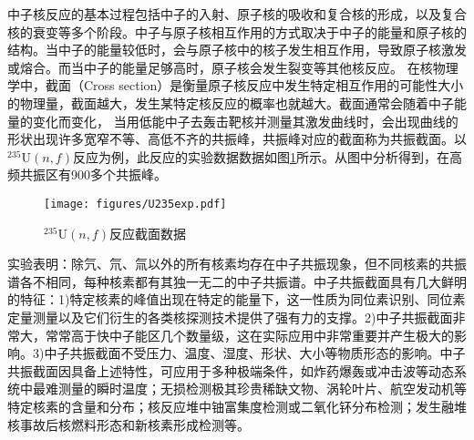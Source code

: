 中子核反应的基本过程包括中子的入射、原子核的吸收和复合核的形成，以及复合核的衰变等多个阶段\cite{卢希庭2000原子核物理}。中子与原子核相互作用的方式取决于中子的能量和原子核的结构。当中子的能量较低时，会与原子核中的核子发生相互作用，导致原子核激发或熔合。而当中子的能量足够高时，原子核会发生裂变等其他核反应。
在核物理学中，截面（Cross section）是衡量原子核反应中发生特定相互作用的可能性大小的物理量，截面越大，发生某特定核反应的概率也就越大。截面通常会随着中子能量的变化而变化，
当用低能中子去轰击靶核并测量其激发曲线时，会出现曲线的形状出现许多宽窄不等、高低不齐的共振峰，共振峰对应的截面称为共振截面。以$^{235}\text{U}(n,f)$反应为例，此反应的实验数据数据如图\ref{u235expendf}所示。从图中分析得到，在高频共振区有900多个共振峰。
\begin{figure}[htbp!]
  \centering
  \texttt{[image: figures/U235exp.pdf]}
  \caption{$^{235}\text{U}(n,f)$反应截面数据}
  \label{u235expendf}
\end{figure}

实验表明：除氕、氘、氚以外的所有核素均存在中子共振现象，但不同核素的共振谱各不相同，每种核素都有其独一无二的中子共振谱。中子共振截面具有几大鲜明的特征\cite{庹先国2020中重核中子共振研究及应用进展}：1)特定核素的峰值出现在特定的能量下，这一性质为同位素识别、同位素定量测量以及它们衍生的各类核探测技术提供了强有力的支撑。2)中子共振截面非常大，常常高于快中子能区几个数量级，这在实际应用中非常重要并产生极大的影响。3)中子共振截面不受压力、温度、湿度、形状、大小等物质形态的影响。中子共振截面因具备上述特性，可应用于多种极端条件，如炸药爆轰或冲击波等动态系统中最难测量的瞬时温度；无损检测极其珍贵稀缺文物、涡轮叶片、航空发动机等特定核素的含量和分布；核反应堆中铀富集度检测或二氧化钚分布检测；发生融堆核事故后核燃料形态和新核素形成检测等。

